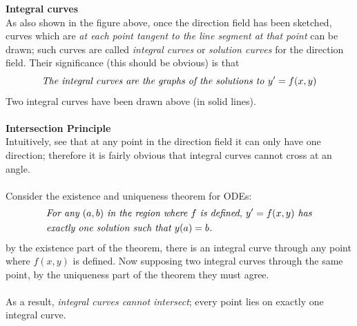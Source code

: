 \documentclass{report}
\begin{document}
\textbf{Integral curves}\\
As also shown in the figure above, once the direction field has been sketched, curves which are \textit{at each
point tangent to the line segment at that point} can be drawn; 
such curves are called \textit{integral curves} or \textit{solution curves} for the direction field.
Their significance (this should be obvious) is that
\begin{equation*}
\text{\textit{The integral curves are the graphs of the solutions to }}y'=f(x,y)
\end{equation*}
Two integral curves have been drawn above (in solid lines).\\
\vspace{1mm}\\
\textbf{Intersection Principle}\\
Intuitively, see that at any point in the direction field it can only have one direction; therefore it is fairly
obvious that integral curves cannot cross at an angle.\\
\vspace{1mm}\\
Consider the existence and uniqueness theorem for ODEs: 
\begin{align*}
&\text{\textit{For any $(a,b)$ in the region where $f$ is defined, $y'=f(x,y)$ has}}\\&\text{\textit{exactly one solution such that 
$y(a)=b$.}}
\end{align*}
by the existence part of the theorem, 
there is an integral curve through any point where $f(x,y)$ is defined. Now supposing two integral curves
through the same point, by the uniqueness part of the theorem they must agree.\\
\vspace{1mm}\\
As a result, \textit{integral curves cannot intersect}; every point lies on exactly one integral curve.
\newpage
\end{document}
